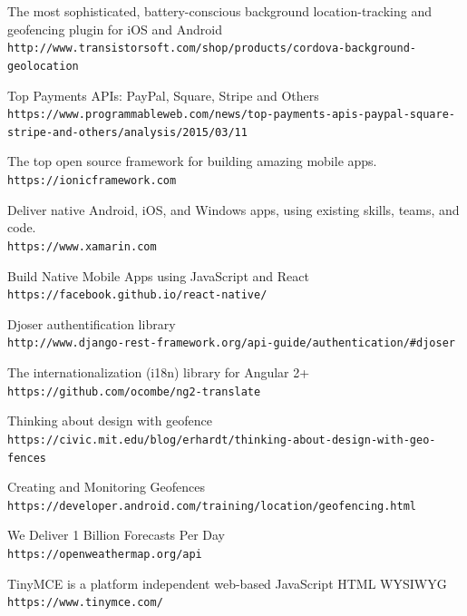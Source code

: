 \documentclass[11pt]{article} %
\begin{document}
\begin{appendices}
\begin{thebibliography}{9}
The most sophisticated, battery-conscious background location-tracking and geofencing plugin for iOS and Android
\\\texttt{http://www.transistorsoft.com/shop/products/cordova-background-geolocation}

Top Payments APIs: PayPal, Square, Stripe and Others
\\\texttt{https://www.programmableweb.com/news/top-payments-apis-paypal-square-stripe-and-others/analysis/2015/03/11}

The top open source framework for building amazing mobile apps.
\\\texttt{https://ionicframework.com}

Deliver native Android, iOS, and Windows apps, using existing skills, teams, and code.
\\\texttt{https://www.xamarin.com}

Build Native Mobile Apps using JavaScript and React
\\\texttt{https://facebook.github.io/react-native/}

Djoser authentification  library
\\\texttt{http://www.django-rest-framework.org/api-guide/authentication/\#djoser}

The internationalization (i18n) library for Angular 2+
\\\texttt{https://github.com/ocombe/ng2-translate}

Thinking about design with geofence
\\\texttt{https://civic.mit.edu/blog/erhardt/thinking-about-design-with-geo-fences}

Creating and Monitoring Geofences
\\\texttt{https://developer.android.com/training/location/geofencing.html}

We Deliver 1 Billion Forecasts Per Day
\\\texttt{https://openweathermap.org/api}

TinyMCE is a platform independent web-based JavaScript HTML WYSIWYG
\\\texttt{https://www.tinymce.com/}


\end{thebibliography}

\newpage


\end{appendices}
\end{document}
